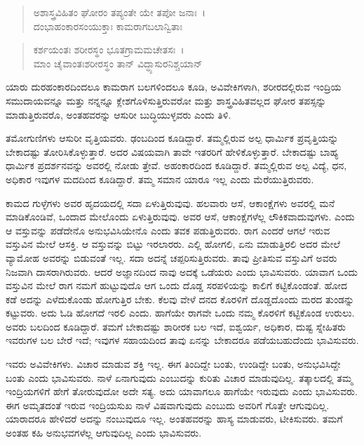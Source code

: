 \begin{verse}
ಅಶಾಸ್ತ್ರವಿಹಿತಂ ಘೋರಂ ತಪ್ಯಂತೇ ಯೇ ತಪೋ ಜನಾಃ~।\\ದಂಭಾಹಂಕಾರಸಂಯುಕ್ತಾಃ ಕಾಮರಾಗಬಲಾನ್ವಿತಾಃ 
\end{verse}

\begin{verse}
ಕರ್ಶಯಂತಃ ಶರೀರಸ್ಥಂ ಭೂತಗ್ರಾಮಮಚೇತಸಃ~।\\ಮಾಂ ಚೈವಾಂತಃಶರೀರಸ್ಥಂ ತಾನ್ ವಿದ್ಧ್ಯಾಸುರನಿಶ್ಚಯಾನ್ 
\end{verse}

{\small ಯಾರು ದುರಹಂಕಾರದಿಂದಲೂ ಕಾಮರಾಗ ಬಲಗಳಿಂದಲೂ ಕೂಡಿ, ಅವಿವೇಕಿಗಳಾಗಿ, ಶರೀರದಲ್ಲಿರುವ ಇಂದ್ರಿಯ ಸಮುದಾಯವನ್ನೂ ಮತ್ತು ನನ್ನನ್ನೂ ಕ್ಲೇಶಗೊಳಿಸುತ್ತಿರುವರೋ ಮತ್ತು ಶಾಸ್ತ್ರವಿಹಿತವಲ್ಲದ ಘೋರ ತಪಸ್ಸನ್ನು ಮಾಡುತ್ತಿರುವರೊ, ಅಂತಹವರನ್ನು ಆಸುರೀ ಬುದ್ಧಿಯುಳ್ಳವರು ಎಂದು ತಿಳಿ.}

ತಮೋಗುಣಿಗಳು ಆಸುರೀ ವೃತ್ತಿಯವರು. ಢಂಬದಿಂದ ಕೂಡಿದ್ದಾರೆ. ತಮ್ಮಲ್ಲಿರುವ ಅಲ್ಪ ಧಾರ್ಮಿಕ ಪ್ರವೃತ್ತಿಯನ್ನು ಬೇಕಾದಷ್ಟು ತೋರಿಸಿಕೊಳ್ಳುತ್ತಾರೆ. ಅದರ ವಿಷಯವಾಗಿ ತಾವೇ ಇತರರಿಗೆ ಹೇಳಿಕೊಳ್ಳುತ್ತಾರೆ. ಬೇಕಾದಷ್ಟು ಬಾಹ್ಯ ಧಾರ್ಮಿಕ ಪ್ರದರ್ಶನವನ್ನು ಅವರಲ್ಲಿ ನೋಡು ತ್ತೇವೆ. ಅಹಂಕಾರದಿಂದ ಕೂಡಿದ್ದಾರೆ. ತಮ್ಮಲ್ಲಿರುವ ಅಲ್ಪ ವಿದ್ಯೆ, ಧನ, ಅಧಿಕಾರ ಇವುಗಳ ಮದದಿಂದ ಕೂಡಿದ್ದಾರೆ. ತಮ್ಮ ಸಮಾನ ಯಾರೂ ಇಲ್ಲ ಎಂದು ಮೆರೆಯುತ್ತಿರುವರು.

ಕಾಮದ ಗುಳ್ಳೆಗಳು ಅವರ ಹೃದಯದಲ್ಲಿ ಸದಾ ಏಳುತ್ತಿರುವುವು. ಹಲವಾರು ಆಸೆ, ಆಕಾಂಕ್ಷೆಗಳು ಅವರಲ್ಲಿ ಮನೆ ಮಾಡಿಕೊಂಡಿವೆ, ಒಂದಾದ ಮೇಲೊಂದು ಏಳುತ್ತಿರುವುವು. ಅವರ ಆಸೆ, ಆಕಾಂಕ್ಷೆಗಳೆಲ್ಲ ಲೌಕಿಕವಾದುವುಗಳು. ಎಂದು ಆ ವಸ್ತುವನ್ನು ಪಡೆದೇನೊ ಅನುಭವಿಸಿಯೇನೊ ಎಂದು ತವಕ ಪಡುತ್ತಿರುವರು. ರಾಗ ಎಂದರೆ ಆಗಲೆ ಇರುವ ವಸ್ತುವಿನ ಮೇಲೆ ಆಸಕ್ತಿ. ಆ ವಸ್ತುವನ್ನು ಬಿಟ್ಟು ಇರಲಾರರು. ಎಲ್ಲಿ ಹೋಗಲಿ, ಏನು ಮಾಡುತ್ತಿರಲಿ ಅದರ ಮೇಲೆ ವ್ಯಾಮೋಹ ಅವರನ್ನು ಬಿಡುವಂತೆ ಇಲ್ಲ. ಸದಾ ಅದನ್ನೆ ಚಪ್ಪರಿಸುತ್ತಿರುವರು. ತಾವು ಪ್ರೀತಿಸುವ ವಸ್ತುವಿಗೆ ಅವರು ನಿಜವಾಗಿ ದಾಸರಾಗಿರುವರು. ಆದರೆ ಅಜ್ಞಾನದಿಂದ ನಾವು ಅದಕ್ಕೆ ಒಡೆಯರು ಎಂದು ಭಾವಿಸುವರು. ಯಾವಾಗ ಒಂದು ವಸ್ತುವಿನ ಮೇಲೆ ರಾಗ ನಮಗೆ ಹುಟ್ಟುವುದೊ ಆಗ ಒಂದು ದೊಡ್ಡ ಸರಪಳಿಯನ್ನು ಕಾಲಿಗೆ ಕಟ್ಟಿಕೊಂಡಂತೆ. ಹೋದ ಕಡೆ ಅದನ್ನು ಎಳೆದುಕೊಂಡು ಹೋಗುತ್ತಿರ ಬೇಕು. ಕೆಲವು ವೇಳೆ ದನದ ಕೊರಳಿಗೆ ದೊಡ್ಡದೊಂದು ಮರದ ತುಂಡನ್ನು ಕಟ್ಟುವರು. ಅದು ಓಡಿ ಹೋಗದೆ ಇರಲಿ ಎಂದು. ಹಾಗೆಯೇ ರಾಗವೇ ಒಂದು ನಮ್ಮ ಕೊರಳಿಗೆ ಕಟ್ಟಿಕೊಂಡ ಉರುಲು. ಅವರು ಬಲದಿಂದ ಕೂಡಿದ್ದಾರೆ. ತಮಗೆ ಬೇಕಾದಷ್ಟು ಶಾರೀರಕ ಬಲ ಇದೆ, ಐಶ್ವರ್ಯ, ಅಧಿಕಾರ, ದುಷ್ಟ ಸ್ನೇಹಿತರು ಇವರುಗಳ ಬಲ ಬೇರೆ ಇದೆ; ಇವುಗಳ ಸಹಾಯದಿಂದ ತಾವು ಏನನ್ನು ಬೇಕಾದರೂ ಪಡೆಯಬಹುದೆಂದು ಭಾವಿಸುವರು.

ಇವರು ಅವಿವೇಕಿಗಳು. ವಿಚಾರ ಮಾಡುವ ಶಕ್ತಿ ಇಲ್ಲ. ಈಗ ತಿಂದಿದ್ದೇ ಬಂತು, ಉಂಡಿದ್ದೇ ಬಂತು, ಅನುಭವಿಸಿದ್ದೇ ಬಂತು ಎಂದು ಭಾವಿಸುವರು. ನಾಳೆ ಏನಾಗುವುದು ಎಂಬುದನ್ನು ಕುರಿತು ವಿಚಾರ ಮಾಡುವುದಿಲ್ಲ. ತತ್ಕಾಲದಲ್ಲಿ ತಮ್ಮ ಇಂದ್ರಿಯಗಳಿಗೆ ಹೇಗೆ ತೋರುವುದೋ ಅದೇ ಸತ್ಯ. ಅದು ಯಾವಾಗಲೂ ಹಾಗೆಯೇ ಇರುವುದು ಎಂದು ಭಾವಿಸುವರು. ಈಗ ಅಮೃತದಂತೆ ಇರುವ ಇಂದ್ರಿಯಸುಖ ನಾಳೆ ವಿಷವಾಗುವುದು ಎಂಬುದು ಅವರಿಗೆ ಗೊತ್ತೇ ಆಗುವುದಿಲ್ಲ. ಯಾರಾದರೂ ಹೇಳಿದರೆ ಅದನ್ನು ನಂಬುವುದೂ ಇಲ್ಲ. ಅಂತಹವರನ್ನು ಹಾಸ್ಯ ಮಾಡುವರು, ಟೀಕಿಸುವರು. ತಮಗೆ ಅಂತಹ ಕಹಿ ಅನುಭವಗಳೆಲ್ಲ ಆಗುವುದಿಲ್ಲ ಎಂದು ಭಾವಿಸುವರು.


